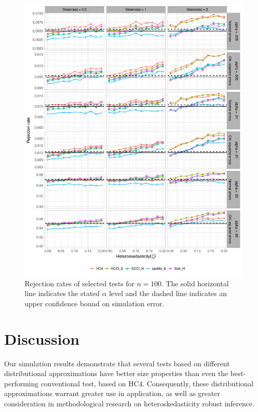 \documentclass[12pt]{article}\usepackage[]{graphicx}\usepackage[]{color}
\newenvironment{knitrout}{}{} %
\begin{document}
\begin{knitrout}
\color{fgcolor}\begin{figure}[p]

{\centering \includegraphics[width=\linewidth]{HC_fig/selected_size_100-1} 

}

\caption[Rejection rates of selected tests for $n = 100$]{Rejection rates of selected tests for $n = 100$. The solid horizontal line indicates the stated $\alpha$ level and the dashed line indicates an upper confidence bound on simulation error.}\label{fig:selected_size_100}
\end{figure}


\end{knitrout}

\section{Discussion}
\label{sec:conc}

Our simulation results demonstrate that several tests based on different distributional approximations have better size properties than even the best-performing conventional test, based on HC4. Consequently, these distributional approximations warrant greater use in application, as well as greater consideration in methodological research on heteroskedasticity robust inference. 
\end{document}
